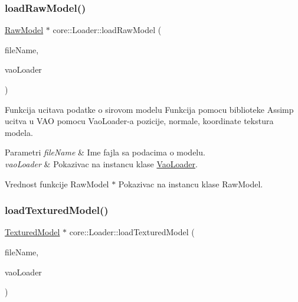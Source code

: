 \subsubsection{\texorpdfstring{load\+Raw\+Model()}{loadRawModel()}}
{\footnotesize\ttfamily \hyperlink{classmodel_1_1RawModel}{Raw\+Model} $\ast$ core\+::\+Loader\+::load\+Raw\+Model (\begin{DoxyParamCaption}\item[{const char $\ast$}]{file\+Name,  }\item[{\hyperlink{classcore_1_1VaoLoader}{Vao\+Loader} $\ast$}]{vao\+Loader }\end{DoxyParamCaption})}



Funkcija ucitava podatke o sirovom modelu Funkcija pomocu biblioteke Assimp ucitva u V\+AO pomocu Vao\+Loader-\/a pozicije, normale, koordinate tekstura modela. 


\begin{DoxyParams}{Parametri}
{\em file\+Name} & Ime fajla sa podacima o modelu. \\
\hline
{\em vao\+Loader} & Pokazivac na instancu klase \hyperlink{classcore_1_1VaoLoader}{Vao\+Loader}. \\
\hline
\end{DoxyParams}
\begin{DoxyReturn}{Vrednost funkcije}
Raw\+Model $\ast$ Pokazivac na instancu klase Raw\+Model. 
\end{DoxyReturn}
\mbox{\label{classcore_1_1Loader_a0738ff43667e227e672b4d12f12afb46}} 
\subsubsection{\texorpdfstring{load\+Textured\+Model()}{loadTexturedModel()}}
{\footnotesize\ttfamily \hyperlink{classmodel_1_1TexturedModel}{Textured\+Model} $\ast$ core\+::\+Loader\+::load\+Textured\+Model (\begin{DoxyParamCaption}\item[{const char $\ast$}]{file\+Name,  }\item[{\hyperlink{classcore_1_1VaoLoader}{Vao\+Loader} $\ast$}]{vao\+Loader }\end{DoxyParamCaption})}




